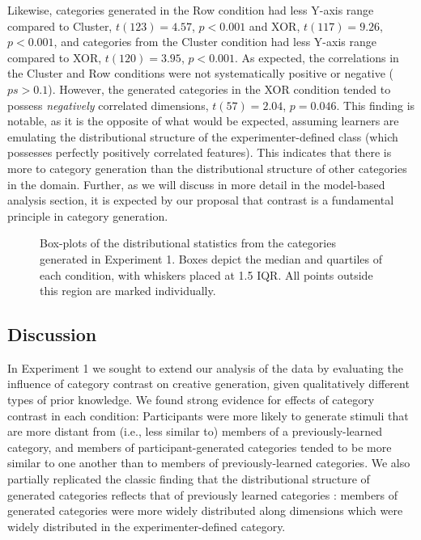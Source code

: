 \documentclass[12pt]{article}
\newcommand\inputpgf[2]{{
\let\pgfimageWithoutPath\pgfimage
\renewcommand{\pgfimage}[2][]{\pgfimageWithoutPath[##1]{#1/##2}}

}}
\begin{document}
\begin{flushleft}
Likewise, categories generated in the Row condition had less Y-axis range compared to Cluster, $t(123) = 4.57$, $p < 0.001$ and XOR, $t(117) = 9.26$, $p < 0.001$, and categories from the Cluster condition had less Y-axis range compared to XOR, $t(120) = 3.95$, $p < 0.001$. As expected, the correlations in the Cluster and Row conditions were not systematically positive or negative ($ps > 0.1$). However, the generated categories in the XOR condition tended to possess {\em negatively} correlated dimensions, $t(57) = 2.04$, $p = 0.046$. This finding is notable, as it is the opposite of what would be expected, assuming learners are emulating the distributional structure of the experimenter-defined class (which possesses perfectly positively correlated features). This indicates that there is more to category generation than the distributional structure of other categories in the domain. Further, as we will discuss in more detail in the model-based analysis section, it is expected by our proposal that contrast is a fundamental principle in category generation.

\begin{figure}
    \begin{center}
    \inputpgf{figs/}{e1-statsboxes.pgf}
    \caption{Box-plots of the distributional statistics from the categories generated in Experiment 1. Boxes depict the median and quartiles of each condition, with whiskers placed at 1.5 IQR. All points outside this region are marked individually.}
    \label{fig:e1-statsboxes}
    \end{center}
\end{figure}


\subsection{Discussion}


In Experiment 1 we sought to extend our analysis of the \cite{jern2013probabilistic} data by evaluating the influence of category contrast on creative generation, given qualitatively different types of prior knowledge. We found strong evidence for effects of category contrast in each condition: Participants were more likely to generate stimuli that are more distant from (i.e., less similar to) members of a previously-learned category, and members of participant-generated categories tended to be more similar to one another than to members of previously-learned categories. We also partially replicated the classic finding that the distributional structure of generated categories reflects that of previously learned categories \citep{jern2013probabilistic,ward1994structured}: members of generated categories were more widely distributed along dimensions which were widely distributed in the experimenter-defined category. 


\end{flushleft}
\end{document}
